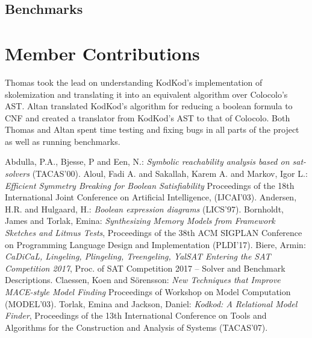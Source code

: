\documentclass[10pt]{article}
\theoremstyle{definition}
\begin{document}
  \subsection{Benchmarks}

  \section{Member Contributions}

  \textsf{Thomas} took the lead on understanding KodKod's implementation of skolemization and translating it into an equivalent algorithm over Colocolo's AST. \textsf{Altan} translated KodKod's algorithm for reducing a boolean formula to CNF and created a translator from KodKod's AST to that of Colocolo. Both \textsf{Thomas} and \textsf{Altan} spent time testing and fixing bugs in all parts of the project as well as running benchmarks.

  \begin{thebibliography}{999}
        Abdulla, P.A., Bjesse, P and Een, N.:
        \emph{Symbolic reachability analysis based on sat-solvers}
        (TACAS'00).
        Aloul, Fadi A. and Sakallah, Karem A. and Markov, Igor L.:
        \emph{Efficient Symmetry Breaking for Boolean Satisfiability}
        Proceedings of the 18th International Joint Conference on Artificial Intelligence, (IJCAI'03).
        Andersen, H.R. and Hulgaard, H.:
        \emph{Boolean expression diagrams}
        (LICS'97).
        Bornholdt, James and Torlak, Emina:
        \emph{Synthesizing Memory Models from Framework Sketches and Litmus Tests},
        Proceedings of the 38th ACM SIGPLAN Conference on Programming Language Design and Implementation (PLDI'17).
        Biere, Armin:
        \emph{CaDiCaL, Lingeling, Plingeling, Treengeling, YalSAT Entering the SAT Competition 2017}, Proc. of SAT Competition 2017 -- Solver and Benchmark Descriptions.
        Claessen, Koen and S{\"o}rensson:
        \emph{New Techniques that Improve {MACE}-style Model Finding}
        Proceedings of Workshop on Model Computation (MODEL'03).
        Torlak, Emina and Jackson, Daniel:
        \emph{Kodkod: A Relational Model Finder},
        Proceedings of the 13th International Conference on Tools and Algorithms for the Construction and Analysis of Systems (TACAS'07).
    \end{thebibliography}
\end{document}
